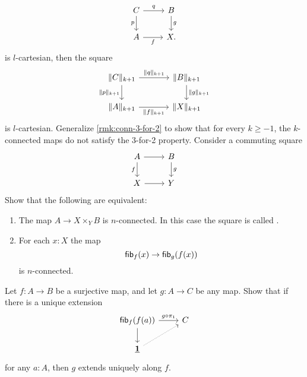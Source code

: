 \begin{exercises}
\begin{equation*}
  \begin{tikzcd}
    C \arrow[r,"q"] \arrow[d,swap,"p"] & B \arrow[d,"g"] \\
    A \arrow[r,swap,"f"] & X.
  \end{tikzcd}
\end{equation*}
is $l$-cartesian, then the square
\begin{equation*}
  \begin{tikzcd}[column sep=large]
    \trunc{k+1}{C} \arrow[r,"\trunc{k+1}{q}"] \arrow[d,swap,"\trunc{k+1}{p}"] & \trunc{k+1}{B} \arrow[d,"\trunc{k+1}{g}"] \\
    \trunc{k+1}{A} \arrow[r,swap,"\trunc{k+1}{f}"] & \trunc{k+1}{X}
  \end{tikzcd}
\end{equation*}
is $l$-cartesian.
\exercise Generalize \cref{rmk:conn-3-for-2} to show that for every $k\geq-1$, the $k$-connected maps do not satisfy the 3-for-2 property.
\exercise Consider a commuting square
\begin{equation*}
\begin{tikzcd}
A \arrow[d,swap,"f"] \arrow[r] & B \arrow[d,"g"] \\
X \arrow[r] & Y
\end{tikzcd}
\end{equation*}
Show that the following are equivalent:
\begin{enumerate}
\item The map $A\to X\times_Y B$ is $n$-connected. In this case the square is called .
\item For each $x:X$ the map
\begin{equation*}
\mathsf{fib}_{f}(x)\to \mathsf{fib}_{g}(f(x))
\end{equation*}
is $n$-connected.
\end{enumerate}
\exercise Let $f:A\to B$ be a surjective map, and let $g:A\to C$ be any map. Show that if there is a unique extension
\begin{equation*}
\begin{tikzcd}
\fib{f}{f(a)} \arrow[r,"g\circ\pi_1"] \arrow[d] & C \\
\unit \arrow[ur,densely dotted]
\end{tikzcd}
\end{equation*}
for any $a:A$, then $g$ extends uniquely along $f$.
\end{exercises}
